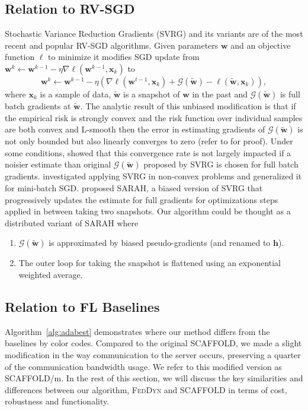 \documentclass[runningheads]{llncs}
\def\algref#1{Algorithm~\ref{#1}}
\def\vh{{\bm{h}}}
\def\vw{{\bm{w}}}
\def\vx{{\bm{x}}}
\newcommand{\scaffold}{\textsc{SCAFFOLD}\xspace}
\newcommand{\feddyn}{\textsc{FedDyn}\xspace}
\newcommand{\sgd}{\textsc{SGD}\xspace}
\newcommand{\rvsgd}{\textsc{RV-SGD}\xspace}
\newcommand{\svrg}{\textsc{SVRG}\xspace}
\newcommand{\sarah}{\textsc{SARAH}\xspace}
\begin{document}
\subsection{Relation to \rvsgd}
Stochastic Variance Reduction Gradients (\svrg) \cite{johnson2013accelerating} and its variants\cite{nguyen2017sarah,bi2021variance,konevcny2014ms2gd,babanezhad2015stopwasting,xiao2014proximal} are of the most recent and popular \rvsgd algorithms. Given parameters $\vw$ and an objective function $\ell$ to minimize it modifies \sgd update from $\vw^k \leftarrow \vw^{k-1} - \eta \nabla \ell (\vw^{k-1}, \vx_k)$ to
\begin{equation}
    \vw^k \leftarrow \vw^{k-1}- \eta (\nabla \ell (\vw^{t-1}, \vx_k) + \mathcal{G}(\tilde{\vw})-\ell(\tilde{\vw}, \vx_k)),
\end{equation}
where $\vx_k$ is a sample of data, $\tilde{\vw}$ is a snapshot of $\vw$ in the past and $\mathcal{G} (\tilde{\vw})$ is full batch gradients at $\tilde{\vw}$. The analytic result of this unbiased modification is that if the empirical risk is strongly convex and the risk function over individual samples are both convex and L-smooth  then the error in estimating gradients of $\mathcal{G} (\tilde{\vw})$ is not only bounded but also linearly converges to zero (refer to \cite{johnson2013accelerating} for proof). Under some conditions, \cite{babanezhad2015stopwasting} showed that this convergence rate is not largely impacted if a noisier estimate than original $\mathcal{G} (\tilde{\vw})$ proposed by \svrg is chosen for full batch gradients. \cite{bi2021variance} investigated applying \svrg in non-convex problems and \cite{konevcny2014ms2gd} generalized it for mini-batch \sgd. \cite{nguyen2017sarah} proposed \sarah, a biased version of \svrg that progressively updates the estimate for full gradients for optimizations steps applied in between taking two snapshots. 
Our algorithm could be thought as a distributed variant of \sarah where 
\begin{enumerate}
    \item $\mathcal{G} (\tilde{\vw})$ is approximated by biased pseudo-gradients (and renamed to $\vh$).
    \item The outer loop for taking the snapshot is flattened using an exponential weighted average.
\end{enumerate}    



\subsection{Relation to FL Baselines}
\label{sec:compare}
\algref{alg:adabest} demonstrates where our method differs from the baselines by color codes.
Compared to the original \scaffold, we made a slight modification in the way communication to the server occurs, preserving a quarter of the communication bandwidth usage.
We refer to this modified version as \scaffold/m.
In the rest of this section, we will discuss the key similarities and differences between our algorithm, \feddyn and \scaffold in terms of cost, robustness and functionality. 
\end{document}
